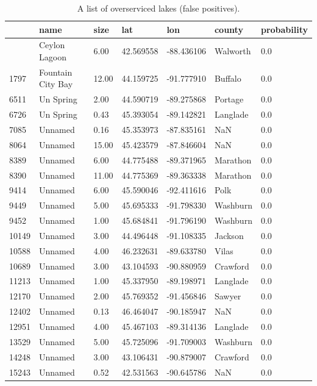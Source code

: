 \documentclass[
]{article}
\begin{document}
\begin{longtable}[]{@{}lllllll@{}}

\caption{\label{tbl-overserviced-lakes}A list of overserviced lakes
(false positives).}

\tabularnewline

\toprule\noalign{}
& name & size & lat & lon & county & probability \\
\midrule\noalign{}
\endhead
\bottomrule\noalign{}
\endlastfoot
927 & Ceylon Lagoon & 6.00 & 42.569558 & -88.436106 & Walworth & 0.0 \\
1797 & Fountain City Bay & 12.00 & 44.159725 & -91.777910 & Buffalo &
0.0 \\
6511 & Un Spring & 2.00 & 44.590719 & -89.275868 & Portage & 0.0 \\
6726 & Un Spring & 0.43 & 45.393054 & -89.142821 & Langlade & 0.0 \\
7085 & Unnamed & 0.16 & 45.353973 & -87.835161 & NaN & 0.0 \\
8064 & Unnamed & 15.00 & 45.423579 & -87.846604 & NaN & 0.0 \\
8389 & Unnamed & 6.00 & 44.775488 & -89.371965 & Marathon & 0.0 \\
8390 & Unnamed & 11.00 & 44.775369 & -89.363338 & Marathon & 0.0 \\
9414 & Unnamed & 6.00 & 45.590046 & -92.411616 & Polk & 0.0 \\
9449 & Unnamed & 5.00 & 45.695333 & -91.798330 & Washburn & 0.0 \\
9452 & Unnamed & 1.00 & 45.684841 & -91.796190 & Washburn & 0.0 \\
10149 & Unnamed & 3.00 & 44.496448 & -91.108335 & Jackson & 0.0 \\
10588 & Unnamed & 4.00 & 46.232631 & -89.633780 & Vilas & 0.0 \\
10689 & Unnamed & 3.00 & 43.104593 & -90.880959 & Crawford & 0.0 \\
11213 & Unnamed & 1.00 & 45.337950 & -89.198971 & Langlade & 0.0 \\
12170 & Unnamed & 2.00 & 45.769352 & -91.456846 & Sawyer & 0.0 \\
12402 & Unnamed & 0.13 & 46.464047 & -90.185947 & NaN & 0.0 \\
12951 & Unnamed & 4.00 & 45.467103 & -89.314136 & Langlade & 0.0 \\
13529 & Unnamed & 5.00 & 45.725096 & -91.709003 & Washburn & 0.0 \\
14248 & Unnamed & 3.00 & 43.106431 & -90.879007 & Crawford & 0.0 \\
15243 & Unnamed & 0.52 & 42.531563 & -90.645786 & NaN & 0.0 \\

\end{longtable}
\end{document}
